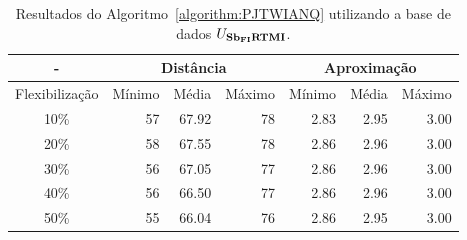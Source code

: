 \begin{table}[!htb]
  \caption{Resultados do Algoritmo~\ref{algorithm:PJTWIANQ} utilizando a base de dados $U_{\textbf{Sb\textsubscript{FI}RTMI}}{}$.}
  \label{table:SKOTKEOE}
  \centering
  \begin{tabular}{|c|r|r|r|r|r|r|}
    \hline
      -            & \multicolumn{3}{c|}{Distância}             & \multicolumn{3}{c|}{Aproximação}           \\ \hline
    Flexibilização & Mínimo       & Média        & Máximo       & Mínimo       & Média        & Máximo       \\ \hline  
    10\%           & 57           & 67.92        & 78           & 2.83         & 2.95         & 3.00         \\ \hline
    20\%           & 58           & 67.55        & 78           & 2.86         & 2.96         & 3.00         \\ \hline
    30\%           & 56           & 67.05        & 77           & 2.86         & 2.96         & 3.00         \\ \hline
    40\%           & 56           & 66.50        & 77           & 2.86         & 2.96         & 3.00         \\ \hline
    50\%           & 55           & 66.04        & 76           & 2.86         & 2.95         & 3.00         \\ \hline    
  \end{tabular}
\end{table}